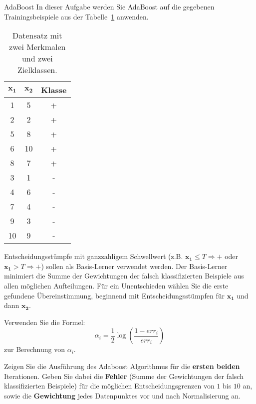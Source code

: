 \begin{task}[credit=15]{AdaBoost}
In dieser Aufgabe werden Sie AdaBoost auf die gegebenen Trainingsbeispiele aus der Tabelle~\ref{t:boost_data} anwenden. 

\begin{table}[h]
\caption{Datensatz mit zwei Merkmalen und zwei Zielklassen.}
\label{t:boost_data}
\centering
\begin{tabular}{c|c|c}
$\mathbf{x_1}$ & $\mathbf{x_2}$  & \textbf{Klasse} \\
\midrule
1 & 5  & +      \\
2 & 2  & +      \\
5 & 8  & +      \\
6 & 10 & +      \\
8 & 7  & +      \\
3  & 1 & -      \\
4  & 6  & -     \\
7  & 4  & -     \\
9  & 3  & -     \\
10 & 9  & -     \\
\bottomrule
\end{tabular}
\end{table}

Entscheidungsstümpfe mit ganzzahligem Schwellwert (z.B. $\mathbf{x_1}\leq T \Rightarrow +$ oder $\mathbf{x_1} > T \Rightarrow +$) sollen als Basis-Lerner verwendet werden. Der Basis-Lerner minimiert die Summe der Gewichtungen der falsch klassifizierten Beispiele aus allen möglichen Aufteilungen. Für ein Unentschieden wählen Sie die erste gefundene Übereinstimmung, beginnend mit Entscheidungsstümpfen für $\mathbf{x_1}$ und dann $\mathbf{x_2}$.

Verwenden Sie die Formel:
\begin{equation}
    \alpha_{i} = \frac{1}{2}\log\left (\frac{1-err_{i}}{err_{i}}\right )
\end{equation}
zur Berechnung von $\alpha_{i}$.

\begin{subtask}[title=Algorithmus,points=12]
 Zeigen Sie die Ausführung des Adaboost Algorithmus für die \textbf{ersten beiden} Iterationen.
 Geben Sie dabei die \textbf{Fehler} (Summe der Gewichtungen der falsch klassifizierten Beispiele) für die möglichen Entscheidungsgrenzen von $1$ bis $10$ an, sowie die \textbf{Gewichtung} jedes Datenpunktes vor und nach Normalisierung an.


\end{subtask}
\end{task}
